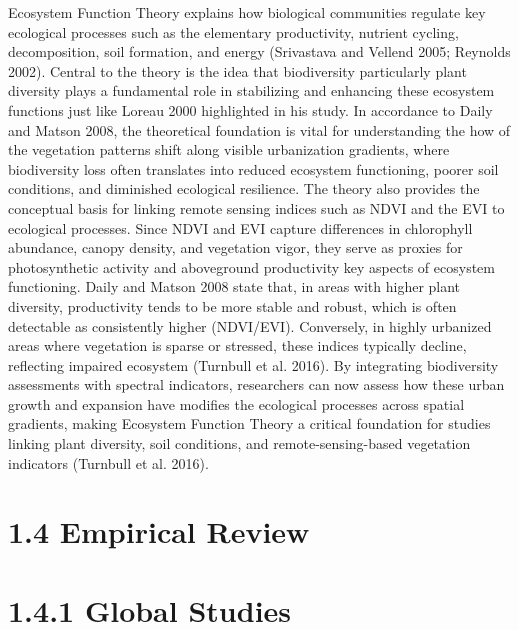 Ecosystem Function Theory explains how biological communities regulate key ecological processes such as the elementary productivity, nutrient cycling, decomposition, soil formation, and energy (Srivastava and Vellend 2005; Reynolds 2002). Central to the theory is the idea that biodiversity particularly plant diversity plays a fundamental role in stabilizing and enhancing these ecosystem functions just like Loreau 2000 highlighted in his study. In accordance to Daily and Matson 2008, the theoretical foundation is vital for understanding the how of the vegetation patterns shift along visible urbanization gradients, where biodiversity loss often translates into reduced ecosystem functioning, poorer soil conditions, and diminished ecological resilience.
The theory also provides the conceptual basis for linking remote sensing indices such as NDVI and the EVI to ecological processes. Since NDVI and EVI capture differences in chlorophyll abundance, canopy density, and vegetation vigor, they serve as proxies for photosynthetic activity and aboveground productivity key aspects of ecosystem functioning. Daily and Matson 2008 state that, in areas with higher plant diversity, productivity tends to be more stable and robust, which is often detectable as consistently higher (NDVI/EVI). Conversely, in highly urbanized areas where vegetation is sparse or stressed, these indices typically decline, reflecting impaired ecosystem (Turnbull et al. 2016). By integrating biodiversity assessments with spectral indicators, researchers can now assess how these urban growth and expansion have modifies the ecological processes across spatial gradients, making Ecosystem Function Theory a critical foundation for studies linking plant diversity, soil conditions, and remote-sensing-based vegetation indicators (Turnbull et al. 2016).
\hypertarget{empirical-review}{%
\section{\texorpdfstring{\textbf{1.4 Empirical Review}}{1.4 Empirical Review}}\label{empirical-review}}

\hypertarget{global-studies}{%
\section{\texorpdfstring{\textbf{1.4.1 Global Studies}}{1.4.1 Global Studies}}\label{global-studies}}

